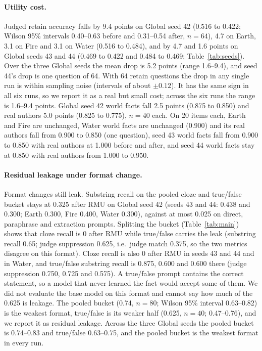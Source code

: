 \documentclass[10pt,twocolumn]{article}
\begin{document}
\paragraph{Utility cost.} Judged retain accuracy falls by 9.4 points on Global seed 42 (0.516 to 0.422; Wilson 95\% intervals 0.40--0.63 before and 0.31--0.54 after, $n=64$), 4.7 on Earth, 3.1 on Fire and 3.1 on Water (0.516 to 0.484), and by 4.7 and 1.6 points on Global seeds 43 and 44 (0.469 to 0.422 and 0.484 to 0.469; Table~\ref{tab:seeds}). Over the three Global seeds the mean drop is 5.2 points (range 1.6--9.4), and seed 44's drop is one question of 64. With 64 retain questions the drop in any single run is within sampling noise (intervals of about $\pm0.12$). It has the same sign in all six runs, so we report it as a real but small cost; across the six runs the range is 1.6--9.4 points. Global seed 42 world facts fall 2.5 points (0.875 to 0.850) and real authors 5.0 points (0.825 to 0.775), $n=40$ each. On 20 items each, Earth and Fire are unchanged, Water world facts are unchanged (0.900) and its real authors fall from 0.900 to 0.850 (one question), seed 43 world facts fall from 0.900 to 0.850 with real authors at 1.000 before and after, and seed 44 world facts stay at 0.850 with real authors from 1.000 to 0.950.

\paragraph{Residual leakage under format change.} Format changes still leak. Substring recall on the pooled cloze and true/false bucket stays at 0.325 after RMU on Global seed 42 (seeds 43 and 44: 0.438 and 0.300; Earth 0.300, Fire 0.400, Water 0.300), against at most 0.025 on direct, paraphrase and extraction prompts. Splitting the bucket (Table~\ref{tab:main}) shows that cloze recall is 0 after RMU while true/false carries the leak (substring recall 0.65; judge suppression 0.625, i.e.\ judge match 0.375, so the two metrics disagree on this format). Cloze recall is also 0 after RMU in seeds 43 and 44 and in Water, and true/false substring recall is 0.875, 0.600 and 0.600 there (judge suppression 0.750, 0.725 and 0.575). A true/false prompt contains the correct statement, so a model that never learned the fact would accept some of them. We did not evaluate the base model on this format and cannot say how much of the 0.625 is leakage. The pooled bucket (0.74, $n=80$; Wilson 95\% interval 0.63--0.82) is the weakest format, true/false is its weaker half (0.625, $n=40$; 0.47--0.76), and we report it as residual leakage. Across the three Global seeds the pooled bucket is 0.74--0.83 and true/false 0.63--0.75, and the pooled bucket is the weakest format in every run.
\end{document}
